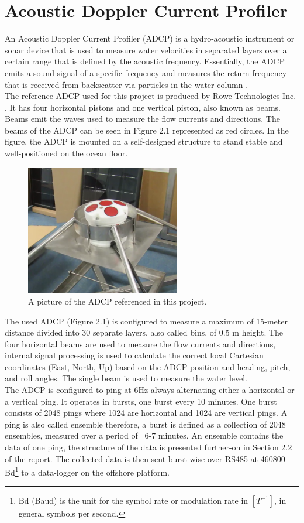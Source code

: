 \section{Acoustic Doppler Current Profiler}
An Acoustic Doppler Current Profiler (ADCP) is a hydro-acoustic instrument or sonar device that is used to measure water velocities in separated layers over a certain range that is defined by the acoustic frequency. Essentially, the ADCP emits a sound signal of a specific frequency and measures the return frequency that is received from backscatter via particles in the water column \cite{adcp_def}.\\
The reference ADCP used for this project is produced by Rowe Technologies Inc. \cite{rowe}. It has four horizontal pistons and one vertical piston, also known as beams. Beams emit the waves used to measure the flow currents and directions. The beams of the ADCP can be seen in Figure 2.1 represented as red circles. In the figure, the ADCP is mounted on a self-designed structure to stand stable and well-positioned on the ocean floor.\\
\begin{figure}[h]
\centering
      \includegraphics[width=0.6\textwidth]{adcp}
        \caption{A picture of the ADCP referenced in this project.}
\end{figure}
The used ADCP (Figure 2.1) is configured to measure a maximum of 15-meter distance divided into 30 separate layers, also called bins, of 0.5 m height. The four horizontal beams are used to measure the flow currents and directions, internal signal processing is used to calculate the correct local Cartesian coordinates (East, North, Up) based on the ADCP position and heading, pitch, and roll angles. The single beam is used to measure the water level.\\
The ADCP is configured to ping at 6Hz always alternating either a horizontal or a vertical ping. It operates in bursts, one burst every 10 minutes. One burst consists of 2048 pings where 1024 are horizontal and 1024 are vertical pings. A ping is also called ensemble therefore, a burst is defined as a collection of 2048 ensembles, measured over a period of ~6-7 minutes. An ensemble contains the data of one ping, the structure of the data is presented further-on in Section 2.2 of the report. The collected data is then sent burst-wise over RS485 at 460800 Bd\footnote{\label{foot:2} Bd (Baud) is the unit for the symbol rate or modulation rate in $[T^{-1}]$, in general symbols per second.} to a data-logger on the offshore platform.

